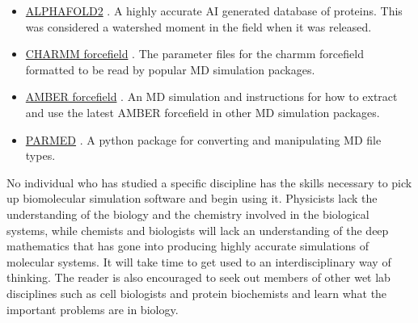 \begin{itemize}
	\item \href{https://alphafold.ebi.ac.uk/}{ALPHAFOLD2} \cite{jumper2021}. A highly accurate AI generated database of proteins. This was considered a watershed moment in the field when it was released.
	\item \href{http://mackerell.umaryland.edu/charmm_ff.shtml}{CHARMM forcefield} \cite{huang2017}. The parameter files for the charmm forcefield formatted to be read by popular MD simulation packages.
	\item \href{https://ambermd.org/AmberModels.php}{AMBER forcefield} \cite{huang2017}. An MD simulation and instructions for how to extract and use the latest AMBER forcefield in other MD simulation packages.
	\item \href{https://parmed.github.io/ParmEd/html/index.html}{PARMED} \cite{shirts2017}. A python package for converting and manipulating MD file types.
\end{itemize}

No individual who has studied a specific discipline has the skills necessary to pick up biomolecular simulation software and begin using it. Physicists lack the understanding of the biology and the chemistry involved in the biological systems, while chemists and biologists will lack an understanding of the deep mathematics that has gone into producing highly accurate simulations of molecular systems. It will take time to get used to an interdisciplinary way of thinking. The reader is also encouraged to seek out members of other wet lab disciplines such as cell biologists and protein biochemists and learn what the important problems are in biology.
